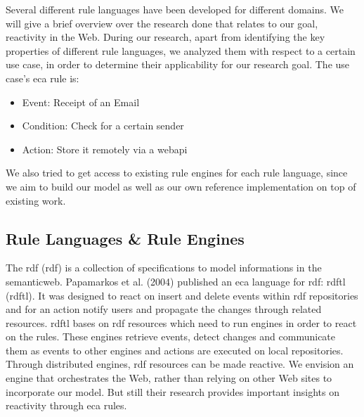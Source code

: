 Several different rule languages have been developed for different domains.
We will give a brief overview over the research done that relates to our goal, reactivity in the Web.
During our research, apart from identifying the key properties of different rule languages, we analyzed them with respect to a certain use case, in order to determine their applicability for our research goal.
The use case's \textrm{\acrshort{eca}} rule is:
\begin{itemize}
  \item Event: Receipt of an Email
  \item Condition: Check for a certain sender
  \item Action: Store it remotely via a \gls{webapi}
\end{itemize}
We also tried to get access to existing rule engines for each rule language, since we aim to build our model as well as our own reference implementation on top of existing work.


\subsection{Rule Languages \& Rule Engines}
The \textrm{\acrlong{rdf} (\acrshort{rdf})} is a collection of specifications to model informations in the \textrm{\gls{semanticweb}}.
Papamarkos et al. (2004) published an \textrm{\acrshort{eca}} language for \textrm{\acrshort{rdf}}: \textrm{\acrlong{rdftl} (\acrshort{rdftl})}.
It was designed to react on insert and delete events within \textrm{\acrshort{rdf}} repositories and for an action notify users and propagate the changes through related resources. %
\textrm{\acrshort{rdftl}} bases on \textrm{\acrshort{rdf}} resources which need to run engines in order to react on the rules.
These engines retrieve events, detect changes and communicate them as events to other engines and actions are executed on local repositories.
Through distributed engines, \textrm{\acrshort{rdf}} resources can be made reactive.
We envision an engine that orchestrates the Web, rather than relying on other Web sites to incorporate our model.
But still their research provides important insights on reactivity through \textrm{\acrshort{eca}} rules.

